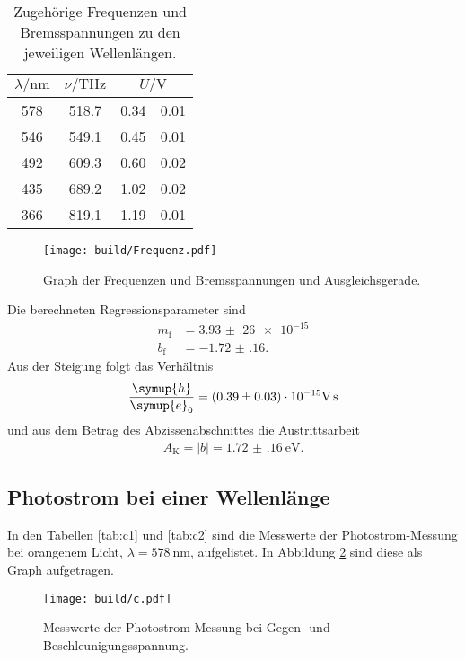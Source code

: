 \begin{table}[h]
  \centering
  \begin{tabular}{S S S @{${}\pm{}$} S}
    \toprule
    {$\lambda/\si{\nano\meter}$} & {$\nu/\si{\tera\hertz}$} & \\
     & 518.7 & 0.34 & 0.01 \\
    546 & 549.1 & 0.45 & 0.01 \\
    492 & 609.3 & 0.60 & 0.02 \\
    435 & 689.2 & 1.02 & 0.02 \\
    366 & 819.1 & 1.19 & 0.01 \\
    \bottomrule
  \end{tabular}
  \caption{Zugehörige Frequenzen und Bremsspannungen zu den jeweiligen Wellenlängen.}
  \label{tab:Frequenz}
\end{table}

\begin{figure}
  \centering
  \texttt{[image: build/Frequenz.pdf]}
  \caption{Graph der Frequenzen und Bremsspannungen und Ausgleichsgerade.}
  \label{fig:Frequenz}
\end{figure}

\FloatBarrier

Die berechneten Regressionsparameter sind
\begin{align}
  m_\text{f} & = \num{3.93(26)e-15} \\
  b_\text{f} & = \num{-1.72(16)}.
\end{align}
Aus der Steigung folgt das Verhältnis
\begin{align}
  \frac{\symup{h}}{\symup{e}_0} = \num{0.39(3)e-15}\si{\volt\second}
\end{align}
und aus dem Betrag des Abzissenabschnittes die Austrittsarbeit
\begin{align}
  A_\text{K} = |b| = \SI{1.72(16)}{\electronvolt}.
\end{align}

\subsection{Photostrom bei einer Wellenlänge}

In den Tabellen \ref{tab:c1} und \ref{tab:c2} sind die Messwerte der
Photostrom-Messung bei orangenem
Licht, $\lambda=\SI{578}{\nano\meter}$, aufgelistet. In Abbildung
\ref{fig:c} sind diese als Graph aufgetragen.

\begin{figure}
  \centering
  \texttt{[image: build/c.pdf]}
  \caption{Messwerte der Photostrom-Messung bei Gegen- und
  Beschleunigungsspannung.}
  \label{fig:c}
\end{figure}

